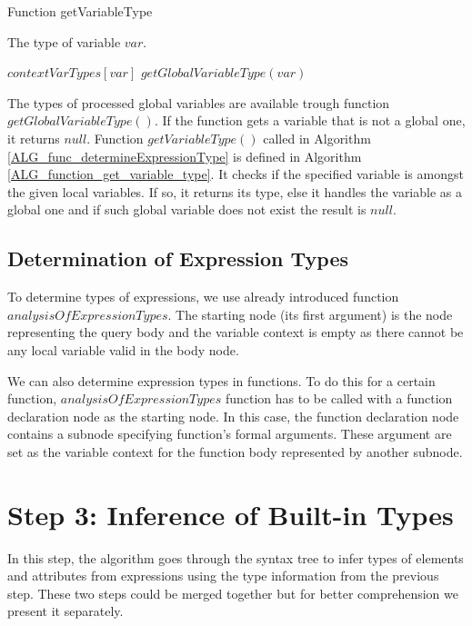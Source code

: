 \begin{algorithm}
\caption{Function getVariableType}
\label{ALG_function_get_variable_type}
\begin{algorithmic}[1]
\ENSURE The type of variable $var$.

     \RETURN $contextVarTypes[var]$
\ELSE
     \RETURN $getGlobalVariableType(var)$
\ENDIF
\end{algorithmic}
\end{algorithm}

The types of processed global variables are available trough function $getGlobalVariableType()$. If the function gets a variable that is not a global one, it returns $null$. Function $getVariableType()$ called in Algorithm \ref{ALG_func_determineExpressionType} is defined in Algorithm \ref{ALG_function_get_variable_type}. It checks if the specified variable is amongst the given local variables. If so, it returns its type, else it handles the variable as a global one and if such global variable does not exist the result is $null$.

\subsection{Determination of Expression Types}
To determine types of expressions, we use already introduced function $analysisOfExpressionTypes$. The starting node (its first argument) is the node representing the query body and the variable context is empty as there cannot be any local variable valid in the body node.

We can also determine expression types in functions. To do this for a certain function, $analysisOfExpressionTypes$ function has to be called with a function declaration node as the starting node. In this case, the function declaration node contains a subnode specifying function's formal arguments. These argument are set as the variable context for the function body represented by another subnode.

\section{Step 3: Inference of Built-in Types}
In this step, the algorithm goes through the syntax tree to infer types of elements and attributes from expressions using the type information from the previous step. These two steps could be merged together but for better comprehension we present it separately.

